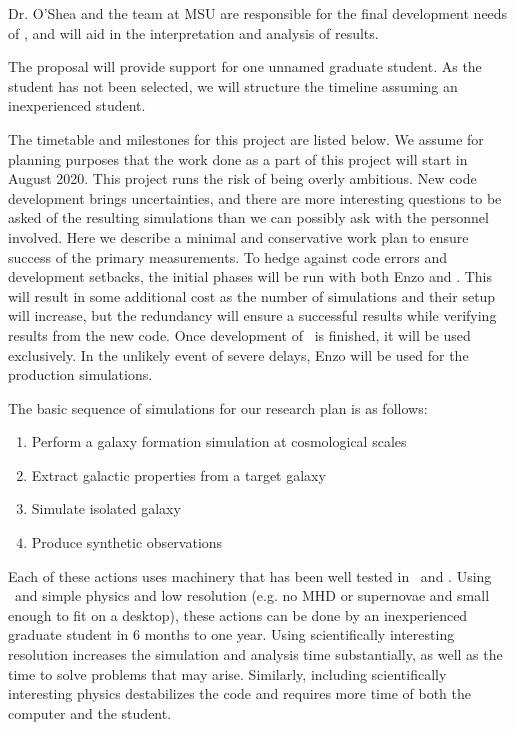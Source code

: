 Dr. O'Shea and the team at MSU are responsible for the final development needs
of \enzoe, and will aid in the interpretation and analysis of results.

The proposal will provide support for one unnamed graduate student.  As the
student has not been selected, we will structure the timeline assuming an
inexperienced student.  

The timetable and milestones for this project are listed below.  We
assume for planning purposes that the work done as a part of this
project will start in August 2020.
This project runs the risk of being overly ambitious.  
New code development 
brings uncertainties, and there are more interesting questions to be asked of
the resulting simulations than we can possibly ask with the personnel involved.  Here we describe a minimal and conservative work
plan to ensure success of the primary measurements.  To hedge against code
errors and development setbacks, the initial phases will be run with both Enzo
and \enzoe.  This will result in some additional cost as the number of
simulations and their setup will increase, but the redundancy will ensure a
successful results while verifying results from the new code.  Once development
of \enzoe\ is finished, it will be used exclusively.  In the unlikely event
of severe delays, Enzo will be used for the production simulations. 

The basic sequence of simulations for our research plan is as follows:
\begin{enumerate}
    \item Perform a galaxy formation simulation at cosmological scales
    \item Extract galactic properties from a target galaxy
    \item Simulate isolated galaxy
    \item Produce synthetic observations
\end{enumerate}
Each of these actions uses machinery that has been well tested in \enzo\ and
\yt.  
Using \enzo\ and simple physics and low resolution (e.g. no MHD or supernovae
and small enough to fit on a desktop), these actions can be done by an
inexperienced graduate student in 
6 months to one year.   Using scientifically interesting resolution increases
the simulation and analysis time substantially, as well as the time to solve problems that may
arise.  Similarly, including scientifically interesting physics destabilizes the code
and requires more time of both the computer and the student.  

